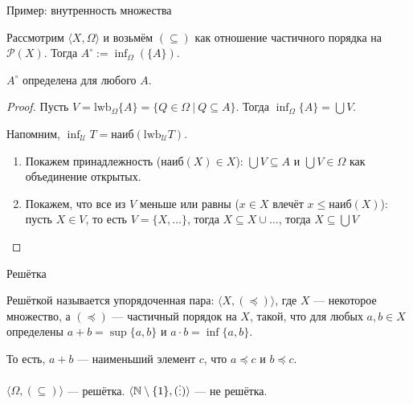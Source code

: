 \documentclass[aspectratio=169]{beamer}
\begin{document}
\begin{frame}{Пример: внутренность множества}
\begin{defrus} Рассмотрим $\langle X, \Omega\rangle$ и возьмём $(\subseteq)$ как отношение частичного порядка на $\mathcal{P}(X)$.
Тогда $A^\circ := \inf_\Omega (\{ A\})$. %
\end{defrus}

\begin{thmrus}$A^\circ$ определена для любого $A$.\end{thmrus}
\begin{proof}

Пусть $V = \text{lwb}_\Omega\{ A \} = \{ Q \in \Omega\ |\ Q \subseteq A\}$. Тогда $\inf_\Omega \{A\} = \bigcup V$.

Напомним, $\inf_\mathcal{U} T = \text{наиб}(\text{lwb}_\mathcal{U} T)$.

\begin{enumerate}
\item Покажем принадлежность ($\text{наиб}(X) \in X$): $\bigcup V \subseteq A$ и $\bigcup V \in \Omega$ как объединение открытых.
\item Покажем, что все из $V$ меньше или равны ($x \in X$ влечёт $x \le \text{наиб}(X)$): пусть $X \in V$, то есть $V = \{ X, \dots \}$, тогда $X \subseteq X \cup \dots$, тогда $X \subseteq \bigcup V$
\end{enumerate}
\end{proof}
\end{frame}

\begin{frame}{Решётка}
\begin{defrus}Решёткой называется упорядоченная пара: $\langle X, (\preceq)\rangle$, 
где $X$ --- некоторое множество, а $(\preceq)$ --- частичный порядок на $X$, такой, 
что для любых $a,b \in X$ определены $a + b = \sup\{a,b\}$ и $a \cdot b = \inf\{a,b\}$.
\end{defrus}

То есть, $a + b$ --- наименьший элемент $c$, что $a \preceq c$ и $b \preceq c$.

\begin{exmprus}
$\langle\Omega, (\subseteq)\rangle$ --- решётка.
$\langle\mathbb{N}\setminus\{1\}, (\raisebox{-0.75pt}{\vdots})\rangle$ --- не решётка.
\end{exmprus}
\end{frame}
\end{document}

